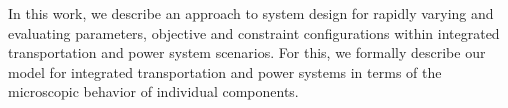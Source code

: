 





In this work, we describe an approach to system design for rapidly varying and evaluating parameters, objective and constraint configurations within integrated transportation and power system scenarios. 
For this, we formally describe our model for integrated transportation and power systems in terms of the microscopic behavior of individual components. \cite{Hackenberg2012, ascher2014early, ascher2015integrated}

